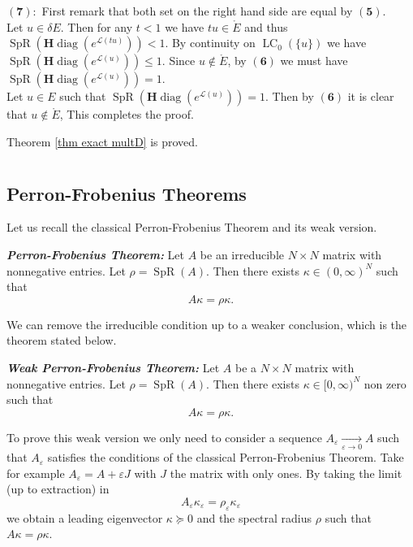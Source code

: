 \documentclass[reqno,final,11pt]{amsart}
\theoremstyle{plain}
\theoremstyle{definition}
\theoremstyle{remark}
\renewcommand{\L}{\bm{\mathscr{L}}}
\renewcommand{\H}{\bm{H}}
\newcommand{\CE}{\ce_{0}}
\DeclareMathOperator{\diag}{diag}
\DeclareMathOperator{\spr}{SpR}
\DeclareMathOperator{\ce}{LC}
\begin{document}
$\bm{(7):}$ First remark that both set on the right hand side are equal by $\bm{(5)}$.\\
	Let $u\in\delta E$. Then for any $t<1$ we have $tu\in \mathring{E}$ and thus $\spr(\H\diag(e^{\L(tu)}))<1$. By continuity on $\CE(\{u\})$ we have $\spr(\H\diag(e^{\L(u)})) \leq 1$. Since $u\notin \mathring{E}$, by $\bm{(6)}$ we must have $\spr(\H\diag(e^{\L(u)})) = 1$.\\
	Let $u\in E$ such that $\spr(\H\diag(e^{\L(u)})) = 1$. Then by $\bm{(6)}$ it is clear that $u\notin \mathring{E}$, This completes the proof.

Theorem \ref{thm exact multD} is proved.

\appendix

\section{}\label{appendixA}

\subsection{Perron-Frobenius Theorems}\label{appendixA.1}

Let us recall the classical Perron-Frobenius Theorem and its weak version.

\textit{\textbf{Perron-Frobenius Theorem:}} Let $A$ be an irreducible $N\times N$ matrix with nonnegative entries. Let $\rho = \spr(A)$. Then there exists $\kappa \in (0,\infty)^N$ such that \[A\kappa = \rho \kappa.\]

We can remove the irreducible condition up to a weaker conclusion, which is the theorem stated below.

\textit{\textbf{Weak Perron-Frobenius Theorem:}} Let $A$ be a $N\times N$ matrix with nonnegative entries. Let $\rho = \spr(A)$. Then there exists $\kappa \in [0,\infty)^N$ non zero such that \[A\kappa = \rho \kappa.\]

To prove this weak version we only need to consider a sequence $A_{\varepsilon} \xrightarrow[\varepsilon\to 0]{} A$ such that $A_{\varepsilon}$ satisfies the conditions of the classical Perron-Frobenius Theorem. Take for example $A_{\varepsilon} = A + \varepsilon J$ with $J$ the matrix with only ones. By taking the limit (up to extraction) in \[A_{\varepsilon} \kappa_{\varepsilon} = \rho_{\varepsilon} \kappa_{\varepsilon}\] we obtain a leading eigenvector $\kappa \succeq 0$ and the spectral radius $\rho$ such that $A\kappa = \rho \kappa$.
\end{document}
